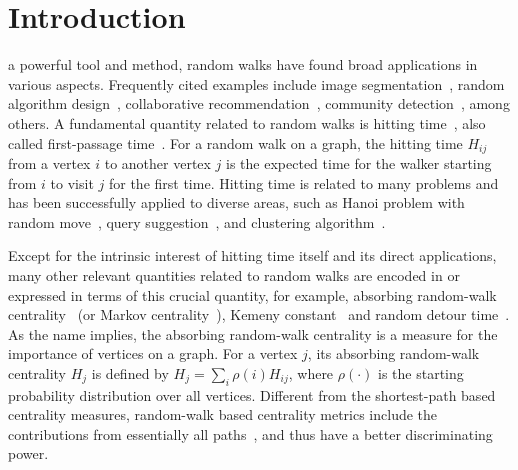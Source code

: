 \documentclass[10pt,journal,compsoc,twocolumn,twoside]{IEEEtran}
\begin{document}
\maketitle

\IEEEdisplaynontitleabstractindextext

\IEEEpeerreviewmaketitle

\section{Introduction}\label{sec:intro}

 a powerful tool and method, random walks have found broad applications in various aspects.
Frequently cited examples include image segmentation~\cite{Le06}, random algorithm design~\cite{SaDi12}, collaborative recommendation~\cite{FoPiReSa07}, community detection~\cite{LaDeBa14}, among others.
A fundamental quantity related to random walks is hitting time~\cite{Lo93}, also called first-passage time~\cite{CoBeTeVoKl07}.
For a random walk on a graph, the hitting time \(H_{ij}\) from a vertex \(i\) to another vertex \(j\) is the expected time for the walker starting from \(i\) to visit \(j\) for the first time.
Hitting time is related to many problems and has been successfully applied to diverse areas, such as Hanoi problem with random move~\cite{WuZhCh11}, query suggestion~\cite{MeZhCh08}, and clustering algorithm~\cite{ChLiTa08}.

Except for the intrinsic interest of hitting time itself and its direct applications, many other relevant quantities related to random walks are encoded in or expressed in terms of this crucial quantity, for example, absorbing random-walk centrality~\cite{MaMagi15} (or Markov centrality~\cite{WhSm03}), Kemeny constant~\cite{Hu14} and random detour time~\cite{RaZh13}.
As the name implies, the absorbing random-walk centrality is a measure for the importance of vertices on a graph.
For a vertex \(j\), its absorbing random-walk centrality \(H_j\) is defined by \(H_j=\sum_{i} \rho(i) H_{ij}\), where \(\rho(\cdot)\) is the starting probability distribution over all vertices.
Different from the shortest-path based centrality measures, random-walk based centrality metrics include the contributions from essentially all paths~\cite{Ne05}, and thus have a better discriminating power.
\end{document}
